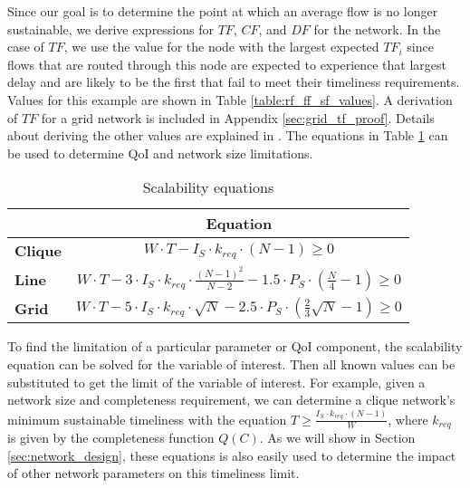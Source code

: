 Since our goal is to determine the point at which an average flow is no longer sustainable, we derive expressions for $TF$, $CF$, and $DF$ for the network.  In the case of $TF$, we use the value for the node with the largest expected $TF_i$ since flows that are routed through this node are expected to experience that largest delay and are likely to be the first that fail to meet their timeliness requirements.  Values for this example are shown in Table \ref{table:rf_ff_sf_values}. A derivation of $TF$ for a grid network is included in Appendix \ref{sec:grid_tf_proof}.  Details about deriving the other values are explained in \cite{symptotics_journal}.  The equations in Table \ref{table:scal_eqs} can be used to determine QoI and network size limitations.

\begin{table}[]
\centering
\begin{tabular}{l|l|}
\cline{2-2}
                             & \multicolumn{1}{c|}{{\bf Equation}} \\ \hline
\multicolumn{1}{|l|}{\textbf{Clique}} & \multicolumn{1}{c|}{$W \cdot T - I_S \cdot k_{req} \cdot (N-1) \geq 0$}            \\ \hline
\multicolumn{1}{|l|}{\textbf{Line}}   & \multicolumn{1}{c|}{$W \cdot T - 3 \cdot I_S \cdot k_{req} \cdot \frac{(N-1)^2}{N-2} - 1.5 \cdot P_S \cdot (\frac{N}{4}-1) \geq 0$}       \\ \hline
\multicolumn{1}{|l|}{\textbf{Grid}}   & \multicolumn{1}{c|}{$W \cdot T - 5 \cdot I_S \cdot k_{req} \cdot \sqrt{N} - 2.5 \cdot P_S \cdot (\frac{2}{3}\sqrt{N} - 1) \geq 0$}      \\ \hline
\end{tabular}
\caption{Scalability equations}
\label{table:scal_eqs}
\end{table}

To find the limitation of a particular parameter or QoI component, the scalability equation can be solved for the variable of interest.  Then all known values can be substituted to get the limit of the variable of interest.  For example, given a network size and completeness requirement, we can determine a clique network's minimum sustainable timeliness with the equation $T  \geq \frac{I_S \cdot k_{req} \cdot (N-1)}{W}$, where $k_{req}$ is given by the completeness function $Q(C)$.  As we will show in Section \ref{sec:network_design}, these equations is also easily used to determine the impact of other network parameters on this timeliness limit. 

%
%


